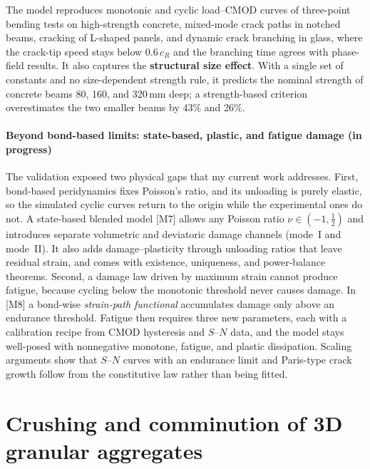 \documentclass[11pt]{article}
\newcommand{\rc}[1]{\textcolor{accent}{[#1]}}
\begin{document}
The model reproduces monotonic and cyclic load--CMOD curves of three-point
bending tests on high-strength concrete, mixed-mode crack paths in notched
beams, cracking of L-shaped panels, and dynamic crack branching in glass, where
the crack-tip speed stays below $0.6\,c_R$ and the branching time agrees with
phase-field results. It also captures the \textbf{structural size effect}. With
a single set of constants and no size-dependent strength rule, it predicts the
nominal strength of concrete beams 80, 160, and 320\,mm deep; a strength-based
criterion overestimates the two smaller beams by 43\% and 26\%.

\paragraph{Beyond bond-based limits: state-based, plastic, and fatigue damage
(in progress)} %
The validation exposed two physical gaps that my current work addresses. First,
bond-based peridynamics fixes Poisson's ratio, and its unloading is purely
elastic, so the simulated cyclic curves return to the origin while the
experimental ones do not. A state-based blended model \rc{M7} allows any
Poisson ratio $\nu\in(-1,\tfrac12)$ and introduces separate volumetric and
deviatoric damage channels (mode~I and mode~II). It also adds damage--plasticity
through unloading ratios that leave residual strain, and comes with existence,
uniqueness, and power-balance theorems. Second, a damage law driven by maximum
strain cannot produce fatigue, because cycling below the monotonic threshold
never causes damage. In \rc{M8} a bond-wise \emph{strain-path functional}
accumulates damage only above an endurance threshold. Fatigue then requires
three new parameters, each with a calibration recipe from CMOD hysteresis and
$S$--$N$ data, and the model stays well-posed with nonnegative monotone,
fatigue, and plastic dissipation. Scaling arguments show that $S$--$N$ curves
with an endurance limit and Paris-type crack growth follow from the
constitutive law rather than being fitted.

\section{Crushing and comminution of 3D granular aggregates}
\end{document}
